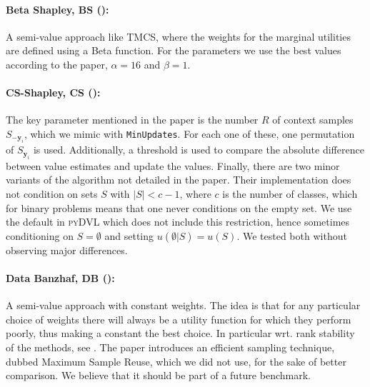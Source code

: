 \documentclass[10pt]{article}
\newcommand{\tmmathbf}[1]{\ensuremath{\boldsymbol{#1}}}
\newcommand{\tmname}[1]{\textsc{#1}}
\newcommand{\python}[1]{\texttt{#1}}
\begin{document}
\paragraph{Beta Shapley, BS ({\cite{kwon_beta_2022}}):}A semi-value approach
like TMCS, where the weights for the marginal utilities are defined using a
Beta function. For the parameters we use the best values according to the
paper, $\alpha = 16$ and $\beta = 1$.

\paragraph{CS-Shapley, CS ({\cite{schoch_csshapley_2022}}):}The key parameter
mentioned in the paper is the number $R$ of context samples
$S_{-\tmmathbf{y}_i}$, which we mimic with {\small{{\python{MinUpdates}}}}.
For each one of these, one permutation of $S_{\tmmathbf{y}_i}$ is used.
Additionally, a threshold is used to compare the absolute difference between
value estimates and update the values. Finally, there are two minor variants
of the algorithm not detailed in the paper. Their implementation does not
condition on sets $S$ with $| S | < c - 1$, where $c$ is the number of
classes, which for binary problems means that one never conditions on the
empty set. We use the default in {\tmname{pyDVL}} which does not include this
restriction, hence sometimes conditioning on $S = \emptyset$ and setting $u
(\emptyset |S) = u (S)$. We tested both without observing major differences.

\paragraph{Data Banzhaf, DB ({\cite{wang_data_2022}}):}A semi-value approach
with constant weights. The idea is that for any particular choice of weights
there will always be a utility function for which they perform poorly, thus
making a constant the best choice. In particular wrt. rank stability of the
methods, see . The paper introduces an efficient
sampling technique, dubbed Maximum Sample Reuse, which we did not use, for the
sake of better comparison. We believe that it should be part of a future
benchmark.
\end{document}
